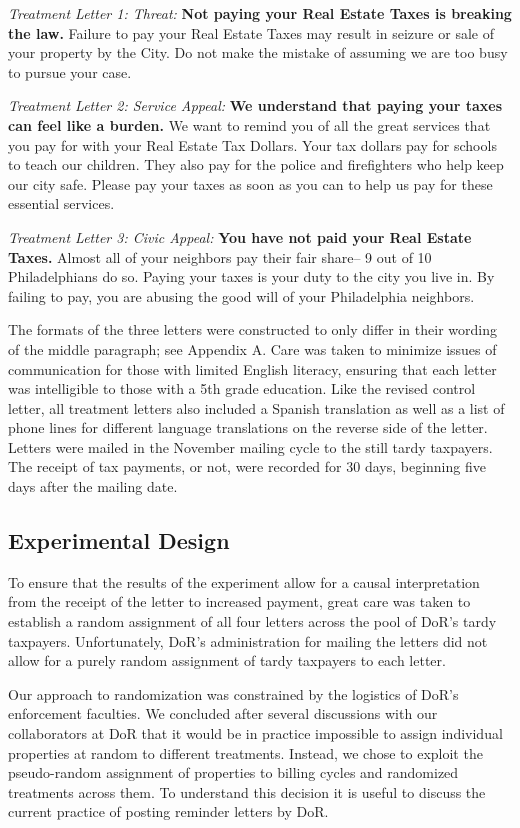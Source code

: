 \documentclass[12pt,titlepage]{article}
\begin{document}
{\it Treatment Letter 1: Threat: } {\bf Not paying your Real Estate
  Taxes is breaking the law.} Failure to pay your Real Estate Taxes
may result in seizure or sale of your property by the City. Do not
make the mistake of assuming we are too busy to pursue your case.

{\it Treatment Letter 2: Service Appeal: } {\bf We understand that
  paying your taxes can feel like a burden.} We want to remind you of
all the great services that you pay for with your Real Estate Tax
Dollars. Your tax dollars pay for schools to teach our children.  They
also pay for the police and firefighters who help keep our city safe.
Please pay your taxes as soon as you can to help us pay for these
essential services.
  
{ \it Treatment Letter 3: Civic Appeal: } {\bf You have not paid your
  Real Estate Taxes.}  Almost all of your neighbors pay their fair
share-- 9 out of 10 Philadelphians do so. Paying your taxes is your
duty to the city you live in. By failing to pay, you are abusing the
good will of your Philadelphia neighbors.

The formats of the three letters were constructed to only differ in
their wording of the middle paragraph; see Appendix A.  Care was taken
to minimize issues of communication for those with limited English
literacy, ensuring that each letter was intelligible to those with a
5th grade education.  Like the revised control letter, all treatment
letters also included a Spanish translation as well as a list of phone
lines for different language translations on the reverse side of the
letter.  Letters were mailed in the November mailing cycle to the
still tardy taxpayers.  The receipt of tax payments, or not, were
recorded for 30 days, beginning five days after the mailing date.


\subsection{Experimental Design}

To ensure that the results of the experiment allow for a causal
interpretation from the receipt of the letter to increased payment,
great care was taken to establish a random assignment of all four
letters across the pool of DoR's tardy taxpayers.  Unfortunately,
DoR's administration for mailing the letters did not allow for a
purely random assignment of tardy taxpayers to each letter.  

Our approach to randomization was constrained by the logistics of
DoR's enforcement faculties. We concluded after several discussions
with our collaborators at DoR that it would be in practice impossible
to assign individual properties at random to different
treatments. Instead, we chose to exploit the pseudo-random assignment
of properties to billing cycles and randomized treatments across them.
To understand this decision it is useful to discuss the current
practice of posting reminder letters by DoR.
\end{document}

